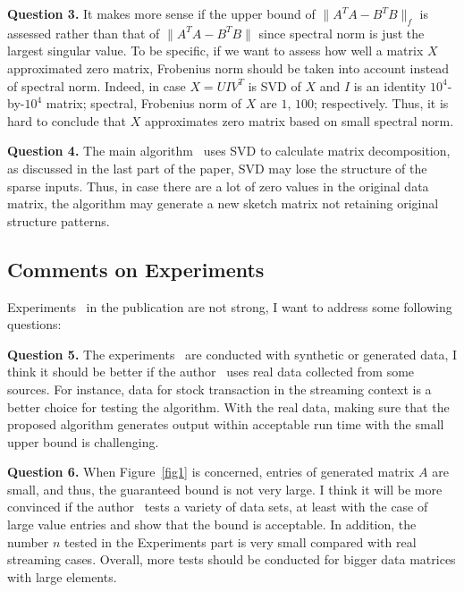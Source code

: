 \documentclass{acm_proc_article-sp}
\begin{document}
\textbf{Question 3.} It makes more sense if the upper bound of $\|A^TA - B^TB\|_{f}$ is assessed rather than that of $\|A^TA - B^TB\|$ since spectral norm is just the largest singular value. To be specific, if we want to assess how well a matrix $X$ approximated zero matrix, Frobenius norm should be taken into account instead of spectral norm. Indeed, in case $X = UIV^T$ is SVD of $X$ and $I$ is an identity $10^4$-by-$10^4$ matrix; spectral, Frobenius norm of $X$ are $1$, $100$; respectively. Thus, it is hard to conclude that $X$ approximates zero matrix based on small spectral norm.

\textbf{Question 4.} The main algorithm~\cite{ref1} uses SVD to calculate matrix decomposition, as discussed in the last part of the paper, SVD may lose the structure of the sparse inputs. Thus, in case there are a lot of zero values in the original data matrix, the algorithm may generate a new sketch matrix not retaining original structure patterns.

\subsection{Comments on Experiments}
Experiments~\cite{ref1} in the publication are not strong, I want to address some following questions:

\textbf{Question 5.} The experiments~\cite{ref1} are conducted with synthetic or generated data, I think it should be better if the author~\cite{ref1} uses real data collected from some sources. For instance, data for stock transaction in the streaming context is a better choice for testing the algorithm. With the real data, making sure that the proposed algorithm generates output within acceptable run time with the small upper bound is challenging.

\textbf{Question 6.} When Figure~\ref{fig1} is concerned, entries of generated matrix $A$ are small, and thus, the guaranteed bound is not very large. I think it will be more convinced if the author~\cite{ref1} tests a variety of data sets, at least with the case of large value entries and show that the bound is acceptable. In addition, the number $n$ tested in the Experiments part is very small compared with real streaming cases. Overall, more tests should be conducted for bigger data matrices with large elements.



\end{document}
